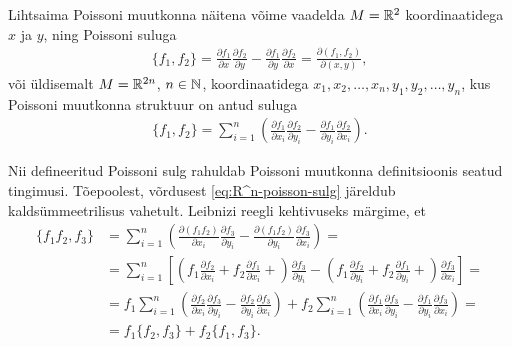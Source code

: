 Lihtsaima Poissoni muutkonna näitena võime vaadelda $M = \mathbb{R}^2$
koordinaatidega $x$ ja $y$, ning Poissoni suluga
\begin{align*}
    \{f_1, f_2\} =
        \frac{\partial f_1}{\partial x} \frac{\partial f_2}{\partial y} -
        \frac{\partial f_1}{\partial y} \frac{\partial f_2}{\partial x} =
        \frac{\partial(f_1, f_2)}{\partial(x, y)},
\end{align*}
või üldisemalt $M = \mathbb{R}^{2n}$, $n \in \mathbb{N}$, koordinaatidega
$x_1, x_2, \dots, x_n, y_1, y_2, \dots, y_n$, kus Poissoni muutkonna
struktuur on antud suluga
\begin{align}\label{eq:R^n-poisson-sulg}
    \{f_1, f_2\} = \sum_{i=1}^{n} \left(
        \frac{\partial f_1}{\partial x_i} \frac{\partial f_2}{\partial y_i} -
        \frac{\partial f_1}{\partial y_i} \frac{\partial f_2}{\partial x_i}
    \right).
\end{align}

Nii defineeritud Poissoni sulg rahuldab Poissoni muutkonna definitsioonis
seatud tingimusi. Tõepoolest, võrdusest \eqref{eq:R^n-poisson-sulg}
järeldub kaldsümmeetrilisus vahetult. Leibnizi reegli kehtivuseks
märgime, et
\begin{align*}
    \{f_1 f_2, f_3\} &= \sum_{i=1}^{n} \left(
        \frac{\partial (f_1 f_2)}{\partial x_i}
        \frac{\partial f_3}{\partial y_i} -
        \frac{\partial (f_1 f_2)}{\partial y_i}
        \frac{\partial f_3}{\partial x_i}
    \right) = \\
    &= \sum_{i=1}^{n} \left[
        \left(
            f_1 \frac{\partial f_2}{\partial x_i} +
            f_2 \frac{\partial f_1}{\partial x_i} +
        \right) \frac{\partial f_3}{\partial y_i} -
        \left(
            f_1 \frac{\partial f_2}{\partial y_i} +
            f_2 \frac{\partial f_1}{\partial y_i} +
        \right) \frac{\partial f_3}{\partial x_i}
    \right] = \\
    &= f_1 \sum_{i=1}^{n} \left(
            \frac{\partial f_2}{\partial x_i}
            \frac{\partial f_3}{\partial y_i} -
            \frac{\partial f_2}{\partial y_i}
            \frac{\partial f_3}{\partial x_i}
        \right) +
        f_2 \sum_{i=1}^{n} \left(
                \frac{\partial f_1}{\partial x_i}
                \frac{\partial f_3}{\partial y_i} -
                \frac{\partial f_1}{\partial y_i}
                \frac{\partial f_3}{\partial x_i}
        \right) = \\
    &= f_1 \{f_2, f_3\} + f_2 \{f_1, f_3\}.
\end{align*}

